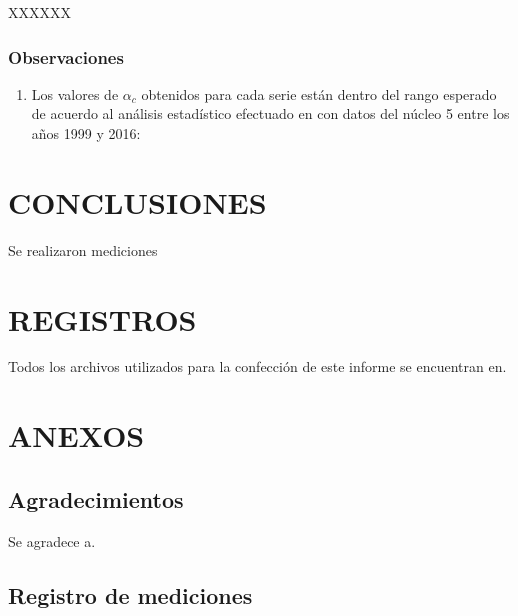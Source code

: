\documentclass[a4paper,11pt]{article}
\begin{document}
XXXXXX

\subsubsection{Observaciones}

\begin{enumerate}[label=\alph*)]

  \item Los valores de $\alpha_c$ obtenidos para cada serie están dentro del rango esperado de acuerdo al análisis estadístico efectuado en con datos del núcleo 5 entre los años 1999 y 2016:


\end{enumerate}


\section{CONCLUSIONES}

Se realizaron mediciones 


\section{REGISTROS}


Todos los archivos utilizados para la confección de este informe se encuentran en.

\newpage

\section{ANEXOS}

\renewcommand{\theequation}{\thesubsection.\arabic{equation}}
\setcounter{equation}{0}  %
\renewcommand{\thetable}{\thesubsection.\arabic{table}}
\setcounter{table}{0}  %
\renewcommand{\thefigure}{\thesubsection.\arabic{figure}}
\setcounter{figure}{0}  %

\renewcommand{\thesubsection}{\Alph{subsection}}

\subsection*{Agradecimientos}

\vspace{-1em}
Se agradece a.

\subsection{Registro de mediciones}\label{sec:reg_med}


\end{document}
